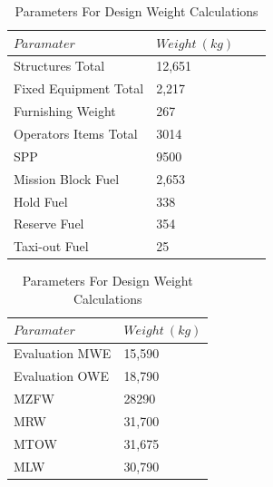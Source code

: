 \documentclass[11pt]{article}
\newcommand{\ra}[1]{\renewcommand{\arraystretch}{#1}}
\begin{document}
\begin{table}[!h]
\centering %
\ra{1.3}
\begin{tabular}{@{}llll@{}}\toprule
$Paramater$ & $Weight \ (kg)$ \\
\midrule
Structures Total & 12,651  \\
Fixed Equipment Total & 2,217 \\ 
Furnishing Weight & 267 \\
Operators Items Total &3014\\
SPP& 9500 \\ 
Mission Block Fuel &2,653\\
Hold Fuel &338 \\
Reserve Fuel &354 \\
Taxi-out Fuel &25\\ 
\bottomrule
\end{tabular}
\caption{Parameters For Design Weight Calculations}
\label{table:dwp}
\end{table}

\begin{table}[!h]
\centering %
\ra{1.3}
\begin{tabular}{@{}ll@{}}\toprule
$Paramater$ & $Weight \ (kg)$ \\
\midrule
Evaluation MWE & 15,590  \\
Evaluation OWE & 18,790 \\ 
MZFW & 28290 \\
MRW & 31,700\\
MTOW&   31,675 \\ 
MLW & 30,790 \\ 
\bottomrule
\end{tabular}
\caption{Parameters For Design Weight Calculations}
\label{table:DW}
\end{table}

\FloatBarrier
\end{document}

